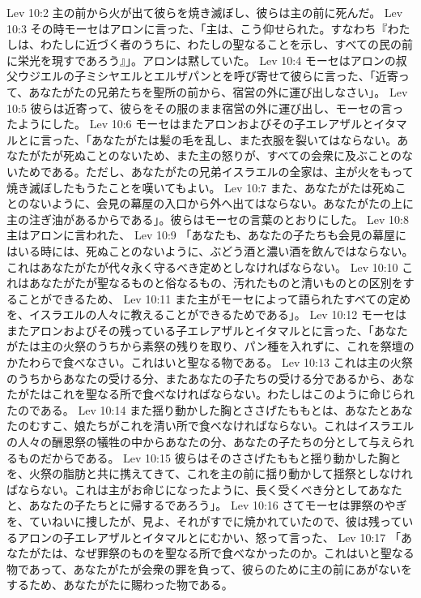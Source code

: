 Lev 10:2  主の前から火が出て彼らを焼き滅ぼし、彼らは主の前に死んだ。
Lev 10:3  その時モーセはアロンに言った、「主は、こう仰せられた。すなわち『わたしは、わたしに近づく者のうちに、わたしの聖なることを示し、すべての民の前に栄光を現すであろう』」。アロンは黙していた。
Lev 10:4  モーセはアロンの叔父ウジエルの子ミシヤエルとエルザパンとを呼び寄せて彼らに言った、「近寄って、あなたがたの兄弟たちを聖所の前から、宿営の外に運び出しなさい」。
Lev 10:5  彼らは近寄って、彼らをその服のまま宿営の外に運び出し、モーセの言ったようにした。
Lev 10:6  モーセはまたアロンおよびその子エレアザルとイタマルとに言った、「あなたがたは髪の毛を乱し、また衣服を裂いてはならない。あなたがたが死ぬことのないため、また主の怒りが、すべての会衆に及ぶことのないためである。ただし、あなたがたの兄弟イスラエルの全家は、主が火をもって焼き滅ぼしたもうたことを嘆いてもよい。
Lev 10:7  また、あなたがたは死ぬことのないように、会見の幕屋の入口から外へ出てはならない。あなたがたの上に主の注ぎ油があるからである」。彼らはモーセの言葉のとおりにした。
Lev 10:8  主はアロンに言われた、
Lev 10:9  「あなたも、あなたの子たちも会見の幕屋にはいる時には、死ぬことのないように、ぶどう酒と濃い酒を飲んではならない。これはあなたがたが代々永く守るべき定めとしなければならない。
Lev 10:10  これはあなたがたが聖なるものと俗なるもの、汚れたものと清いものとの区別をすることができるため、
Lev 10:11  また主がモーセによって語られたすべての定めを、イスラエルの人々に教えることができるためである」。
Lev 10:12  モーセはまたアロンおよびその残っている子エレアザルとイタマルとに言った、「あなたがたは主の火祭のうちから素祭の残りを取り、パン種を入れずに、これを祭壇のかたわらで食べなさい。これはいと聖なる物である。
Lev 10:13  これは主の火祭のうちからあなたの受ける分、またあなたの子たちの受ける分であるから、あなたがたはこれを聖なる所で食べなければならない。わたしはこのように命じられたのである。
Lev 10:14  また揺り動かした胸とささげたももとは、あなたとあなたのむすこ、娘たちがこれを清い所で食べなければならない。これはイスラエルの人々の酬恩祭の犠牲の中からあなたの分、あなたの子たちの分として与えられるものだからである。
Lev 10:15  彼らはそのささげたももと揺り動かした胸とを、火祭の脂肪と共に携えてきて、これを主の前に揺り動かして揺祭としなければならない。これは主がお命じになったように、長く受くべき分としてあなたと、あなたの子たちとに帰するであろう」。
Lev 10:16  さてモーセは罪祭のやぎを、ていねいに捜したが、見よ、それがすでに焼かれていたので、彼は残っているアロンの子エレアザルとイタマルとにむかい、怒って言った、
Lev 10:17  「あなたがたは、なぜ罪祭のものを聖なる所で食べなかったのか。これはいと聖なる物であって、あなたがたが会衆の罪を負って、彼らのために主の前にあがないをするため、あなたがたに賜わった物である。

